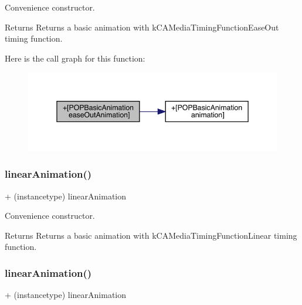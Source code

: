 Convenience constructor. \begin{DoxyReturn}{Returns}
Returns a basic animation with k\+C\+A\+Media\+Timing\+Function\+Ease\+Out timing function. 
\end{DoxyReturn}
Here is the call graph for this function\+:\nopagebreak
\begin{figure}[H]
\begin{center}
\leavevmode
\includegraphics[width=345pt]{interface_p_o_p_basic_animation_acc9d80c152ce8a12051fb83487bed541_cgraph}
\end{center}
\end{figure}
\mbox{\label{interface_p_o_p_basic_animation_a67906e9230c1e8a01d052d86445c9d1e}} 
\subsubsection{\texorpdfstring{linear\+Animation()}{linearAnimation()}\hspace{0.1cm}{\footnotesize\ttfamily [1/3]}}
{\footnotesize\ttfamily + (instancetype) linear\+Animation \begin{DoxyParamCaption}{ }\end{DoxyParamCaption}}

Convenience constructor. \begin{DoxyReturn}{Returns}
Returns a basic animation with k\+C\+A\+Media\+Timing\+Function\+Linear timing function. 
\end{DoxyReturn}
\mbox{\label{interface_p_o_p_basic_animation_a67906e9230c1e8a01d052d86445c9d1e}} 
\subsubsection{\texorpdfstring{linear\+Animation()}{linearAnimation()}\hspace{0.1cm}{\footnotesize\ttfamily [2/3]}}
{\footnotesize\ttfamily + (instancetype) linear\+Animation \begin{DoxyParamCaption}{ }\end{DoxyParamCaption}}

